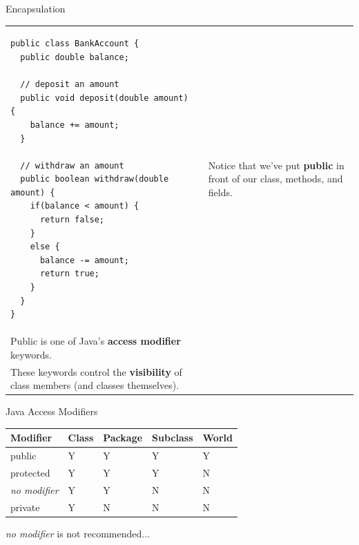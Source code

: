 \documentclass[aspectratio=169]{beamer}
\begin{document}
\begin{frame}[fragile]{Encapsulation}

\centering
\begin{tabular}{@{}m{} | m{}@{} m{}@{}}

\begin{Verbatim}[fontsize=\tiny]
public class BankAccount {
  public double balance;
  
  // deposit an amount
  public void deposit(double amount) {
    balance += amount;
  }
  
  // withdraw an amount
  public boolean withdraw(double amount) {
    if(balance < amount) {
      return false;
    }
    else {
      balance -= amount;
      return true;
    }
  }
}
\end{Verbatim}

&&

\raggedright
Notice that we've put \textbf{public} in front of our class, methods, and fields. \\
\vspace{1em}
Public is one of Java's \textbf{access modifier} keywords. \\
\vspace{1em}
These keywords control the \textbf{visibility} of class members (and classes themselves). 

\end{tabular}

\end{frame}



\begin{frame}[fragile]{Java Access Modifiers}
\begin{center}
\begin{tabular}{ l | l | l | l | l }
\textbf{Modifier} & \textbf{Class} & \textbf{Package} & \textbf{Subclass} & \textbf{World} \\
\hline
public & Y & Y & Y & Y \\
\hline
protected & Y & Y & Y & N \\
\hline
\textit{no modifier} & Y & Y & N & N \\
\hline
private & Y & N & N & N \\
\end{tabular}
\end{center}
\textit{no modifier} is not recommended... \\
\end{frame}
\end{document}
